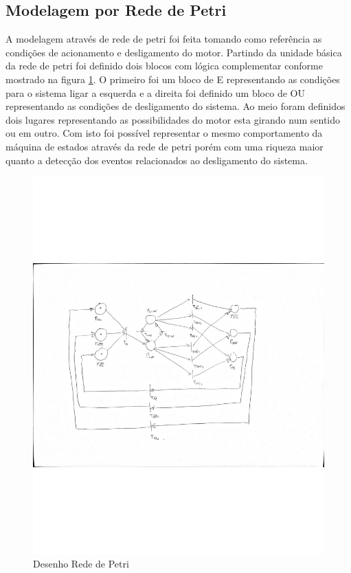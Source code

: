 \documentclass[a4paper,11pt]{article}
\begin{document}
\subsection{Modelagem por Rede de Petri}

A modelagem através de rede de petri foi feita tomando como referência as condições de acionamento e desligamento do motor. Partindo da unidade básica da rede de petri foi definido dois blocos com lógica complementar conforme mostrado na figura \ref{fig:petrinet}. O primeiro foi um bloco de E representando as condições para o sistema ligar a esquerda e a direita foi definido um bloco de OU representando as condições de desligamento do sistema. Ao meio foram definidos dois lugares representando as possibilidades do motor esta girando num sentido ou em outro. Com isto foi possível representar o mesmo comportamento da máquina de estados através da rede de petri porém com uma riqueza maior quanto a detecção dos eventos relacionados ao desligamento do sistema.

\begin{figure}[H]
    \centering
    \includegraphics[trim=2cm 8cm 4cm 8cm,clip,width=0.8\linewidth]{src/tex/img/petrinet_drawing.pdf}
    \caption{Desenho Rede de Petri}
    \label{fig:petrinet}
\end{figure}
\end{document}
